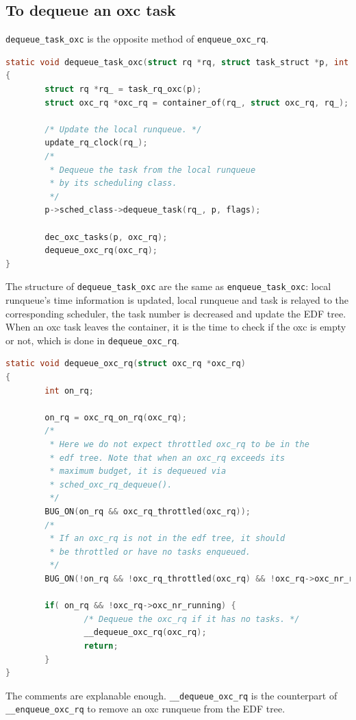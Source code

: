 \subsection{To dequeue an oxc task}
\texttt{dequeue\_task\_oxc} is the opposite method of 
\texttt{enqueue\_oxc\_rq}.
\begin{lstlisting}[language=C, 
		caption={To remove a task from the oxc local runqueue}]
static void dequeue_task_oxc(struct rq *rq, struct task_struct *p, int flags)
{
        struct rq *rq_ = task_rq_oxc(p);
        struct oxc_rq *oxc_rq = container_of(rq_, struct oxc_rq, rq_);

        /* Update the local runqueue. */
        update_rq_clock(rq_);
        /*
         * Dequeue the task from the local runqueue 
         * by its scheduling class.
         */
        p->sched_class->dequeue_task(rq_, p, flags);

        dec_oxc_tasks(p, oxc_rq);
        dequeue_oxc_rq(oxc_rq);
}
\end{lstlisting}
The structure of \texttt{dequeue\_task\_oxc} are the same as 
\texttt{enqueue\_task\_oxc}: local runqueue's time information is updated,
local runqueue and task is relayed to the corresponding scheduler, 
the task number is decreased and update the EDF tree. When an oxc task 
leaves the container, it is the time to check if the oxc is empty or not, 
which is done in \texttt{dequeue\_oxc\_rq}.
\begin{lstlisting}[language=C,
		caption={Remove an ox container from the EDF tree}]
static void dequeue_oxc_rq(struct oxc_rq *oxc_rq)
{
        int on_rq;

        on_rq = oxc_rq_on_rq(oxc_rq);
        /*
         * Here we do not expect throttled oxc_rq to be in the 
         * edf tree. Note that when an oxc_rq exceeds its 
         * maximum budget, it is dequeued via 
         * sched_oxc_rq_dequeue().
         */
        BUG_ON(on_rq && oxc_rq_throttled(oxc_rq));
        /* 
         * If an oxc_rq is not in the edf tree, it should 
         * be throttled or have no tasks enqueued.
         */
        BUG_ON(!on_rq && !oxc_rq_throttled(oxc_rq) && !oxc_rq->oxc_nr_running);

        if( on_rq && !oxc_rq->oxc_nr_running) {
                /* Dequeue the oxc_rq if it has no tasks. */
                __dequeue_oxc_rq(oxc_rq);
                return;
        }
}
\end{lstlisting}
The comments are explanable enough. \texttt{\_\_dequeue\_oxc\_rq} 
is the counterpart of \texttt{\_\_enqueue\_oxc\_rq} to remove an oxc
runqueue from the EDF tree.

